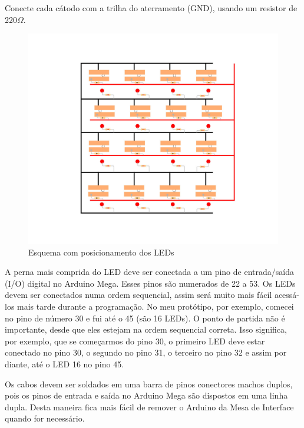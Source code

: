 \documentclass[paper=a4, fontsize=11pt]{scrartcl} %
\numberwithin{equation}{section} %
\numberwithin{figure}{section} %
\numberwithin{table}{section} %
\begin{document}
Conecte cada cátodo com a trilha do aterramento (GND), usando um resistor de 220$\Omega$.

\begin{figure}[H] %
  \centering
  \includegraphics[scale=0.15]{./imagens/board-7.jpg}
  \caption[ ]{Esquema com posicionamento dos LEDs }
  \label{fig:esquemas com leds}
\end{figure}

A perna mais comprida do LED deve ser conectada a um pino de entrada/saída (I/O) digital no Arduino Mega. Esses pinos são numerados de 22 a 53. Os LEDs devem ser conectados numa ordem sequencial, assim será muito mais fácil acessá-los mais tarde durante a programação. No meu protótipo, por exemplo, comecei no pino de número 30 e fui até o 45 (são 16 LEDs).
O ponto de partida não é importante, desde que eles estejam na ordem sequencial correta. Isso significa, por exemplo, que se começarmos do pino 30, o primeiro LED deve estar conectado no pino 30, o segundo no pino 31, o terceiro no pino 32 e assim por diante, até o LED 16 no pino 45.

Os cabos devem ser soldados em uma barra de pinos conectores machos duplos, pois os pinos de entrada e saída no Arduino Mega são dispostos em uma linha dupla. Desta maneira fica mais fácil de remover o Arduino da Mesa de Interface quando for necessário.
\end{document}
